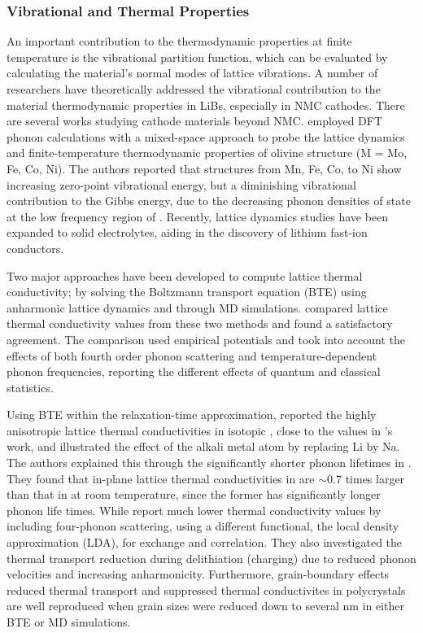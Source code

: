 \documentclass[../main.tex]{subfiles}
\begin{document}
\subsubsection{Vibrational and Thermal Properties}
An important contribution to the thermodynamic properties at finite temperature is the vibrational partition function, which can be evaluated by calculating the material’s normal modes of lattice vibrations. A number of researchers have theoretically addressed the vibrational contribution to the material thermodynamic properties in LiBs, especially in NMC cathodes.\cite{du2016insight,yang2019highly,yang2020chemical} There are several works studying cathode materials beyond NMC. \citeauthor{shang2012lattice} employed DFT phonon calculations with a mixed-space approach to probe the lattice dynamics and finite-temperature thermodynamic properties of olivine structure  (M = Mo, Fe, Co, Ni).\cite{shang2012lattice} The authors reported that  structures from Mn, Fe, Co, to Ni show increasing zero-point vibrational energy, but a diminishing vibrational contribution to the Gibbs energy, due to the decreasing phonon densities of state at the low frequency region of . Recently, lattice dynamics studies have been expanded to solid electrolytes, aiding in the discovery of lithium fast-ion conductors.\cite{sagotra2019influence} 

Two major approaches have been developed to compute lattice thermal conductivity; by solving the Boltzmann transport equation (BTE) using anharmonic lattice dynamics and through MD simulations. \citeauthor{puligheddu2019computational} compared lattice thermal conductivity values from these two methods and found a satisfactory agreement.\cite{puligheddu2019computational} The comparison used empirical potentials and took into account the effects of both fourth order phonon scattering and temperature-dependent phonon frequencies, reporting the different effects of quantum and classical statistics.

Using BTE within the relaxation-time approximation, \citeauthor{mattila2020lattice} reported the highly anisotropic lattice thermal conductivities in isotopic , close to the values in \citeauthor{yang2019highly}'s work\cite{yang2019highly,yang2020chemical}, and illustrated the effect of the alkali metal atom by replacing Li by Na.\cite{mattila2020lattice} The authors explained this through the significantly shorter phonon lifetimes in . They found that in-plane lattice thermal conductivities in  are $\sim$0.7 times larger than that in  at room temperature, since the former has significantly longer phonon life times. While \citeauthor{feng2020quantum} report much lower thermal conductivity values by including four-phonon scattering, using a different functional, the local density approximation (LDA), for exchange and correlation.\cite{feng2020quantum} They also investigated the thermal transport reduction during delithiation (charging) due to reduced phonon velocities and increasing anharmonicity. Furthermore, grain-boundary effects reduced thermal transport and suppressed thermal conductivites in polycrystals are well reproduced when grain sizes were reduced down to several nm in either BTE or MD simulations. \cite{he2019thermal}
\end{document}
